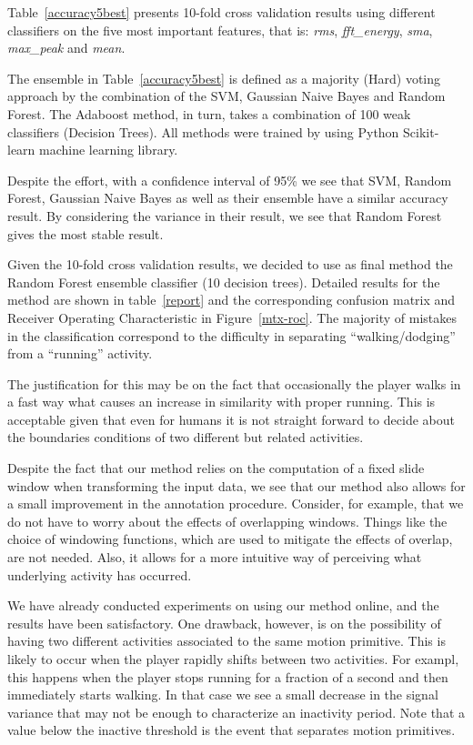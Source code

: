 Table~\ref{accuracy5best} presents 10-fold cross validation results using different classifiers on the five most important features, that is: \textit{rms}, \textit{fft\_energy}, \textit{sma}, \textit{max\_peak} and \textit{mean}. 

The ensemble in Table~\ref{accuracy5best} is defined as a majority (Hard) voting approach by the combination of the SVM, Gaussian Naive Bayes and Random Forest. The Adaboost method, in turn, takes a combination of 100 weak classifiers (Decision Trees). All methods were trained by using Python Scikit-learn machine learning library.

Despite the effort, with a confidence interval of 95\% we see that SVM, Random Forest, Gaussian Naive Bayes as well as their ensemble have a similar accuracy result. By considering the variance in their result, we see that Random Forest gives the most stable result. 

Given the 10-fold cross validation results, we decided to use as final method the Random Forest ensemble classifier (10 decision trees). Detailed results for the method are shown in table~\ref{report} and the corresponding confusion matrix and Receiver Operating Characteristic in Figure~\ref{mtx-roc}. The majority of mistakes in the classification correspond to the difficulty in separating ``walking/dodging'' from  a ``running'' activity. 

The justification for this may be on the fact that occasionally the player walks in a fast way what causes an increase in similarity with proper running. This is acceptable given that even for humans it is not straight forward to decide about the boundaries conditions of two different but related activities.

Despite the fact that our method relies on the computation of a fixed slide window when transforming the input data, we see that our method also allows for a small improvement in the annotation procedure. Consider, for example, that we do not have to worry about the effects of overlapping windows. Things like the choice of windowing functions, which are used to mitigate the effects of overlap, are not needed. Also, it allows for a more intuitive way of perceiving what underlying activity has occurred.

We have already conducted experiments on using our method online, and the results have been satisfactory. One drawback, however, is on the possibility of having two different activities associated to the same motion primitive. This is likely to occur when the player rapidly shifts between two activities. For exampl, this happens when the player stops running for a fraction of a second and then immediately starts walking. In that case we see a small decrease in the signal variance that may not be enough to characterize an inactivity period. Note that a value below the inactive threshold is the event that separates motion primitives.

